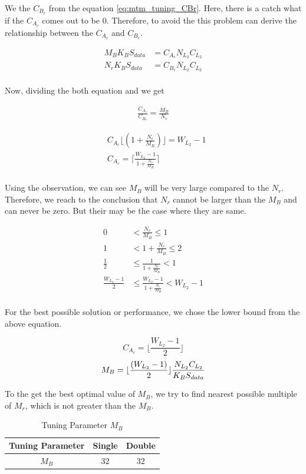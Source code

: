 We the $C_{B_r}$ from the equation \ref{eq:mtm_tuning_CBr}. Here, there is a catch what if
the $C_{A_c}$ comes out to be $0$. Therefore, to avoid the this problem can derive the 
relationship between the $C_{A_c}$ and $C_{B_r}$.

\begin{align*}
    M_B K_B S_{data} &= C_{A_c} N_{L_2} C_{L_2}\\
    N_r K_B S_{data} &= C_{B_r} N_{L_2} C_{L_2}\\
\end{align*}

Now, dividing the both equation and we get

\begin{align*}
    \frac{C_{A_c}}{C_{B_r}} = \frac{M_B}{N_r}
\end{align*}

\begin{align*}
    &C_{A_c} \lfloor ( 1 + \frac{N_r}{M_B} ) \rfloor = W_{L_2} - 1\\
    &C_{A_c} = \lceil \frac{W_{L_2} - 1}{1 + \frac{N_r}{M_B}} \rceil\\
\end{align*}

Using the observation, we can see $M_B$ will be very large compared to the $N_r$. Therefore,
we reach to the conclusion that $N_r$ cannot be larger than the $M_B$ and can never be zero.
But their may be the case where they are same.


\begin{align*}
    0 &< \frac{N_r}{M_B} \leq 1\\
    1 &< 1 + \frac{N_r}{M_B} \leq 2\\
    \frac{1}{2} &\leq \frac{1}{1 + \frac{N_r}{M_B}} < 1\\
    \frac{W_{L_2} - 1}{2} &\leq \frac{W_{L_2} - 1}{1 + \frac{N_r}{M_B}} < W_{L_2} - 1\\
\end{align*}

For the best possible solution or performance, we chose the lower bound from the above equation.

\[
    C_{A_c} = \lfloor \frac{W_{L_2} - 1}{2} \rfloor
\]
\[
    M_B = \lfloor \frac{(W_{L_2} - 1)}{2} \rfloor \frac{N_{L_2} C_{L_2}}{K_B S_{data}}\\
\]

To the get the best optimal value of $M_B$, we try to find nearest possible 
multiple of $M_r$, which is not greater than the $M_B$.

\begin{table}[ht]
    \centering
    \caption{Tuning Parameter $M_B$}
    \begin{tabular}{|c|c|c|}
        \hline
        \textbf{Tuning Parameter} & \textbf{Single} & \textbf{Double}\\
        \hline
        $M_B$   & $32$ & $32$ \\
        \hline
    \end{tabular}
\end{table}

